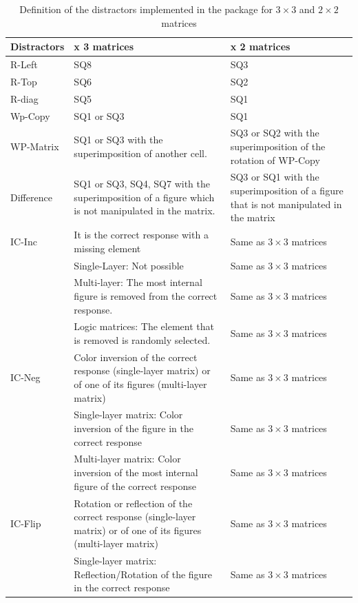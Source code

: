 \begin{table}

\caption{\label{tab:dist-types-tab-static}Definition of the distractors implemented in the  package for $3 \times 3$ and $2 \times 2$ matrices}
\centering
\begin{tabular}[t]{>{\raggedright\arraybackslash}p{3cm}|>{\raggedright\arraybackslash}p{5cm}|>{\raggedright\arraybackslash}p{5cm}}
\hline
Distractors & 3 x 3 matrices & 2 x 2 matrices\\
\hline
R-Left & SQ8 & SQ3\\
\hline
R-Top & SQ6 & SQ2\\
\hline
R-diag & SQ5 & SQ1\\
\hline
Wp-Copy & SQ1 or SQ3 & SQ1\\
\hline
WP-Matrix & SQ1 or SQ3 with the superimposition of another cell. & SQ3 or SQ2 with the superimposition of the rotation of WP-Copy\\
\hline
Difference & SQ1 or SQ3, SQ4, SQ7 with the superimposition of a figure which is not manipulated in the matrix. & SQ3 or SQ1 with the superimposition of a figure that is not manipulated in the matrix\\
\hline
IC-Inc & It is the correct response with a missing element & Same as $3\times 3$ matrices\\
\hline
 & Single-Layer: Not possible & Same as $3\times 3$ matrices\\
\hline
 & Multi-layer: The most internal figure is removed from the correct response. & Same as $3\times 3$ matrices\\
\hline
 & Logic matrices: The element that is removed is randomly selected. & Same as $3\times 3$ matrices\\
\hline
IC-Neg & Color inversion of the correct response (single-layer matrix) or of one of its figures (multi-layer matrix) & Same as $3\times 3$ matrices\\
\hline
 & Single-layer matrix:     Color inversion of the figure in the correct response & Same as $3\times 3$ matrices\\
\hline
 & Multi-layer matrix: Color inversion of the most internal figure of the correct response & Same as $3\times 3$ matrices\\
\hline
IC-Flip & Rotation or reflection of the correct response (single-layer matrix) or of one of its figures (multi-layer matrix) & Same as $3\times 3$ matrices\\
\hline
 & Single-layer matrix: Reflection/Rotation of the figure in the correct response & Same as $3\times 3$ matrices\\

\end{tabular}
\end{table}
